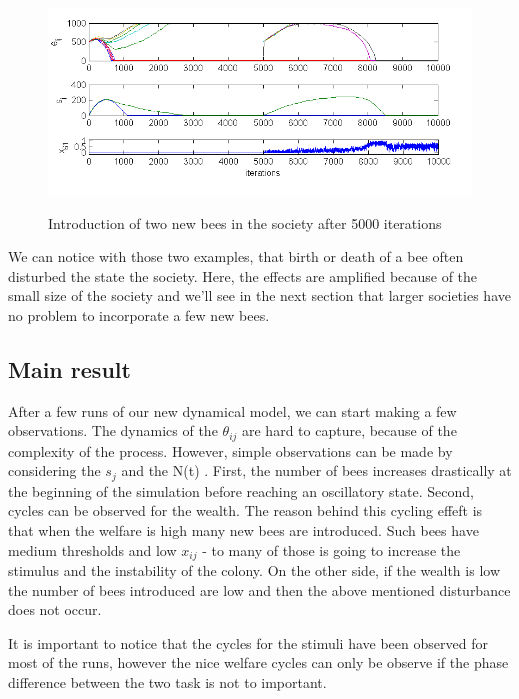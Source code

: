 \begin{figure}[ht!]
\begin{centering}
\includegraphics[scale=0.8]{figures/Figure5}
\label{fig:figure7}
\par\end{centering}

\centering{}\caption{Introduction of two new bees in the society after 5000 iterations}
\end{figure}


We can notice with those two examples, that birth or death of a bee
often disturbed the state the society. Here, the effects are amplified
because of the small size of the society and we'll see in the next
section that larger societies have no problem to incorporate a few
new bees.


\subsection{Main result}

After a few runs of our new dynamical model, we can start making a
few observations. The dynamics of the $\theta_{ij}$ are hard to capture,
because of the complexity of the process. However, simple observations
can be made by considering the $s_{j}$ and the N(t) . First, the
number of bees increases drastically at the beginning of the simulation
before reaching an oscillatory state. Second, cycles can be observed
for the wealth. The reason behind this cycling effeft is that when
the welfare is high many new bees are introduced. Such bees have medium
thresholds and low $x_{ij}$ - to many of those is going to increase
the stimulus and the instability of the colony. On the other side,
if the wealth is low the number of bees introduced are low and then
the above mentioned disturbance does not occur.

It is important to notice that the cycles for the stimuli have been
observed for most of the runs, however the nice welfare cycles can
only be observe if the phase difference between the two task is not
to important. 

